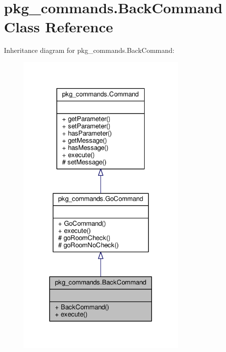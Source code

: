 \hypertarget{classpkg__commands_1_1BackCommand}{\section{pkg\-\_\-commands.\-Back\-Command Class Reference}
\label{classpkg__commands_1_1BackCommand}
}


Inheritance diagram for pkg\-\_\-commands.\-Back\-Command\-:
\nopagebreak
\begin{figure}[H]
\begin{center}
\leavevmode
\includegraphics[width=236pt]{classpkg__commands_1_1BackCommand__inherit__graph}
\end{center}
\end{figure}



